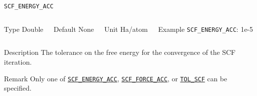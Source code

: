 \begin{frame}[allowframebreaks]{\texttt{SCF\_ENERGY\_ACC}} \label{SCF_ENERGY_ACC}
\vspace*{-12pt}
\begin{columns}
\begin{block}{Type}
Double
\end{block}

\begin{block}{Default}
None
\end{block}

\begin{block}{Unit}
Ha/atom
\end{block}

\begin{block}{Example}
\texttt{SCF\_ENERGY\_ACC}: 1e-5
\end{block}
\end{columns}

\begin{block}{Description}
The tolerance on the free energy for the convergence of the SCF iteration. 
\end{block}

\begin{block}{Remark}
Only one of \hyperlink{SCF_ENERGY_ACC}{\texttt{SCF\_ENERGY\_ACC}}, \hyperlink{SCF_FORCE_ACC}{\texttt{SCF\_FORCE\_ACC}}, or \hyperlink{TOL_SCF}{\texttt{TOL\_SCF}} can be specified.
\end{block}

\end{frame}




